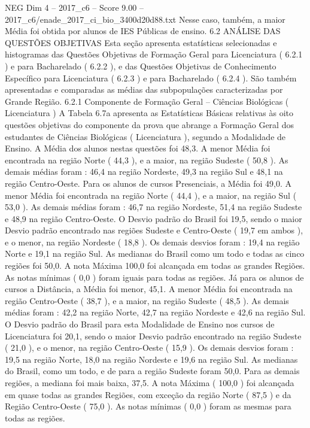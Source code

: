 \begin{textsample}{NEG Dim 4 – 2017\_c6 – Score 9.00 – 2017\_c6/enade\_2017\_ci\_bio\_3400d20d88.txt}
Nesse caso, também, a maior Média foi obtida por alunos de IES Públicas de ensino. 6.2 ANÁLISE DAS QUESTÕES OBJETIVAS Esta seção apresenta estatísticas selecionadas e histogramas das Questões Objetivas de Formação Geral para Licenciatura ( 6.2.1 ) e para Bacharelado ( 6.2.2 ), e das Questões Objetivas de Conhecimento Específico para Licenciatura ( 6.2.3 ) e para Bacharelado ( 6.2.4 ).
São também apresentadas e comparadas as médias das subpopulações caracterizadas por Grande Região. 6.2.1 Componente de Formação Geral – Ciências Biológicas ( Licenciatura ) A Tabela 6.7a apresenta as Estatísticas Básicas relativas às oito questões objetivas do componente da prova que abrange a Formação Geral dos estudantes de Ciências Biológicas ( Licenciatura ), segundo a Modalidade de Ensino.
A Média dos alunos nestas questões foi 48,3.
A menor Média foi encontrada na região Norte ( 44,3 ), e a maior, na região Sudeste ( 50,8 ).
As demais médias foram : 46,4 na região Nordeste, 49,3 na região Sul e 48,1 na região Centro-Oeste.
Para os alunos de cursos Presenciais, a Média foi 49,0.
A menor Média foi encontrada na região Norte ( 44,4 ), e a maior, na região Sul ( 53,0 ).
As demais médias foram : 46,7 na região Nordeste, 51,4 na região Sudeste e 48,9 na região Centro-Oeste.
O Desvio padrão do Brasil foi 19,5, sendo o maior Desvio padrão encontrado nas regiões Sudeste e Centro-Oeste ( 19,7 em ambos ), e o menor, na região Nordeste ( 18,8 ).
Os demais desvios foram : 19,4 na região Norte e 19,1 na região Sul.
As medianas do Brasil como um todo e todas as cinco regiões foi 50,0.
A nota Máxima 100,0 foi alcançada em todas as grandes Regiões.
As notas mínimas ( 0,0 ) foram iguais para todas as regiões.
Já para os alunos de cursos a Distância, a Média foi menor, 45,1.
A menor Média foi encontrada na região Centro-Oeste ( 38,7 ), e a maior, na região Sudeste ( 48,5 ).
As demais médias foram : 42,2 na região Norte, 42,7 na região Nordeste e 42,6 na região Sul.
O Desvio padrão do Brasil para esta Modalidade de Ensino nos cursos de Licenciatura foi 20,1, sendo o maior Desvio padrão encontrado na região Sudeste ( 21,0 ), e o menor, na região Centro-Oeste ( 15,9 ).
Os demais desvios foram : 19,5 na região Norte, 18,0 na região Nordeste e 19,6 na região Sul.
As medianas do Brasil, como um todo, e de para a região Sudeste foram 50,0.
Para as demais regiões, a mediana foi mais baixa, 37,5.
A nota Máxima ( 100,0 ) foi alcançada em quase todas as grandes Regiões, com exceção da região Norte ( 87,5 ) e da Região Centro-Oeste ( 75,0 ).
As notas mínimas ( 0,0 ) foram as mesmas para todas as regiões.

\end{textsample}
